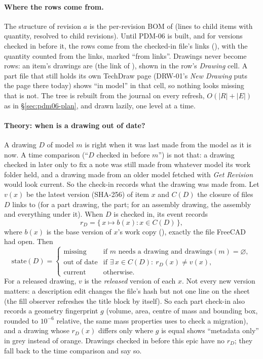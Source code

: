 \paragraph{Where the rows come from.} The structure of revision $a$ is the per-revision BOM of 
(lines to child items with quantity, resolved to child revisions). Until PDM-06 is built, and for versions checked in
before it, the rows come from the checked-in file's links (), with the quantity
counted from the links, marked ``from links''. Drawings never become rows: an item's drawings are
 (the  link of ), shown in the row's \emph{Drawing} cell. A
part file that still holds its own TechDraw page (DRW-01's \emph{New Drawing} puts the page there today) shows
``in model'' in that cell, so nothing looks missing that is not. The tree is rebuilt from the journal on every refresh,
$O(|R|+|E|)$ as in \S\ref{sec:pdm06-plan}, and drawn lazily, one level at a time.

\paragraph{Theory: when is a drawing out of date?} A drawing $D$ of model $m$ is right when it was last made from the
model as it is now. A time comparison (``$D$ checked in before $m$'') is not that: a drawing checked in later only to fix
a note was still made from whatever model its work folder held, and a drawing made from an older model fetched with
\emph{Get Revision} would look current. So the check-in records what the drawing was made from. Let $v(x)$ be the
latest version (SHA-256) of item $x$ and $C(D)$ the closure of files $D$ links to (for a part drawing, the part; for an
assembly drawing, the assembly and everything under it). When $D$ is checked in, its event records
\[
  r_D = \{\,x \mapsto b(x) : x \in C(D)\,\},
\]
where $b(x)$ is the base version of $x$'s work copy (), exactly the file FreeCAD had open. Then
\[
  \mathrm{state}(D) =
  \begin{cases}
    \text{missing} & \text{if } m \text{ needs a drawing and } \mathrm{drawings}(m) = \varnothing,\\
    \text{out of date} & \text{if } \exists\, x \in C(D):\ r_D(x) \ne v(x),\\
    \text{current} & \text{otherwise.}
  \end{cases}
\]
For a released drawing, $v$ is the \emph{released} version of each $x$. Not every new version matters: a description
edit changes the file's hash but not one line on the sheet (the fill observer refreshes the title block by itself).
So each part check-in also records a geometry fingerprint $g$ (volume, area, centre of mass and bounding box, rounded
to $10^{-6}$ relative, the same mass properties  uses to check a migration), and a drawing whose $r_D(x)$
differs only where $g$ is equal shows ``metadata only'' in grey instead of orange. Drawings checked in before this
epic have no $r_D$; they fall back to the time comparison and say so.

